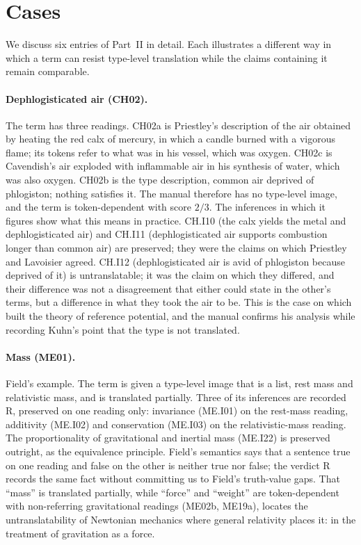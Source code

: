 \documentclass{situationist-preprint}
\begin{document}
\section{Cases}\label{s:cases}

We discuss six entries of Part~II in detail. Each illustrates a different way in which a term can resist type-level translation while the claims containing it remain comparable.

\paragraph{Dephlogisticated air (CH02).} The term has three readings. CH02a is Priestley's description of the air obtained by heating the red calx of mercury, in which a candle burned with a vigorous flame; its tokens refer to what was in his vessel, which was oxygen. CH02c is Cavendish's air exploded with inflammable air in his synthesis of water, which was also oxygen. CH02b is the type description, common air deprived of phlogiston; nothing satisfies it. The manual therefore has no type-level image, and the term is token-dependent with score $2/3$. The inferences in which it figures show what this means in practice. CH.I10 (the calx yields the metal and dephlogisticated air) and CH.I11 (dephlogisticated air supports combustion longer than common air) are preserved; they were the claims on which Priestley and Lavoisier agreed. CH.I12 (dephlogisticated air is avid of phlogiston because deprived of it) is untranslatable; it was the claim on which they differed, and their difference was not a disagreement that either could state in the other's terms, but a difference in what they took the air to be. This is the case on which \citet{Kitcher1978} built the theory of reference potential, and the manual confirms his analysis while recording Kuhn's point that the type is not translated.

\paragraph{Mass (ME01).} Field's example. The term is given a type-level image that is a list, rest mass and relativistic mass, and is translated partially. Three of its inferences are recorded R, preserved on one reading only: invariance (ME.I01) on the rest-mass reading, additivity (ME.I02) and conservation (ME.I03) on the relativistic-mass reading. The proportionality of gravitational and inertial mass (ME.I22) is preserved outright, as the equivalence principle. Field's semantics says that a sentence true on one reading and false on the other is neither true nor false; the verdict R records the same fact without committing us to Field's truth-value gaps. That \enquote{mass} is translated partially, while \enquote{force} and \enquote{weight} are token-dependent with non-referring gravitational readings (ME02b, ME19a), locates the untranslatability of Newtonian mechanics where general relativity places it: in the treatment of gravitation as a force.
\end{document}
